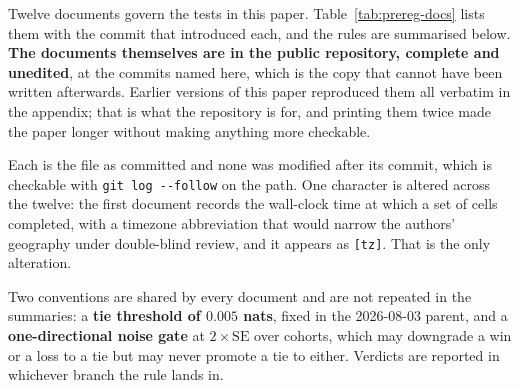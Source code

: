 Twelve documents govern the tests in this paper. Table~\ref{tab:prereg-docs}
lists them with the commit that introduced each, and the rules are
summarised below. \textbf{The documents themselves are in the public
repository, complete and unedited}, at the commits named here, which is the
copy that cannot have been written afterwards. Earlier versions of this paper
reproduced them all verbatim in the appendix; that is what the repository is
for, and printing them twice made the paper longer without making anything
more checkable.

Each is the file as committed and none was modified after its commit, which
is checkable with \texttt{git log -{}-follow} on the path. One character is
altered across the twelve: the first document records the wall-clock time at
which a set of cells completed, with a timezone abbreviation that would
narrow the authors' geography under double-blind review, and it appears as
\texttt{[tz]}. That is the only alteration.

Two conventions are shared by every document and are not repeated in the
summaries: a \textbf{tie threshold of $0.005$ nats}, fixed in the
2026-08-03 parent, and a \textbf{one-directional noise gate} at
$2\times\mathrm{SE}$ over cohorts, which may downgrade a win or a loss to a
tie but may never promote a tie to either. Verdicts are reported in
whichever branch the rule lands in.

